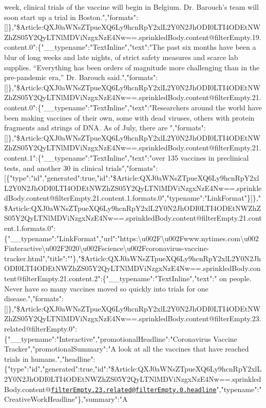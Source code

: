 week, clinical trials of the vaccine will begin in Belgium. Dr.
Barouch's team will soon start up a trial in
Boston.","formats":{[}{]}\},"\$Article:QXJ0aWNsZTpueXQ6Ly9hcnRpY2xlL2Y0N2JhODI0LTI4ODEtNWZhZS05Y2QyLTNlMDViNzgxNzE4Nw==.sprinkledBody.content@filterEmpty.19.content.0":\{"\_\_typename":"TextInline","text":"The
past six months have been a blur of long weeks and late nights, of
strict safety measures and scarce lab supplies. ``Everything has been
orders of magnitude more challenging than in the pre-pandemic era,'' Dr.
Barouch
said.","formats":{[}{]}\},"\$Article:QXJ0aWNsZTpueXQ6Ly9hcnRpY2xlL2Y0N2JhODI0LTI4ODEtNWZhZS05Y2QyLTNlMDViNzgxNzE4Nw==.sprinkledBody.content@filterEmpty.21.content.0":\{"\_\_typename":"TextInline","text":"Researchers
around the world have been making vaccines of their own, some with dead
viruses, others with protein fragments and strings of DNA. As of July,
there are
","formats":{[}{]}\},"\$Article:QXJ0aWNsZTpueXQ6Ly9hcnRpY2xlL2Y0N2JhODI0LTI4ODEtNWZhZS05Y2QyLTNlMDViNzgxNzE4Nw==.sprinkledBody.content@filterEmpty.21.content.1":\{"\_\_typename":"TextInline","text":"over
135 vaccines in preclinical tests, and another 30 in clinical
trials","formats":{[}\{"type":"id","generated":true,"id":"\$Article:QXJ0aWNsZTpueXQ6Ly9hcnRpY2xlL2Y0N2JhODI0LTI4ODEtNWZhZS05Y2QyLTNlMDViNzgxNzE4Nw==.sprinkledBody.content@filterEmpty.21.content.1.formats.0","typename":"LinkFormat"\}{]}\},"\$Article:QXJ0aWNsZTpueXQ6Ly9hcnRpY2xlL2Y0N2JhODI0LTI4ODEtNWZhZS05Y2QyLTNlMDViNzgxNzE4Nw==.sprinkledBody.content@filterEmpty.21.content.1.formats.0":\{"\_\_typename":"LinkFormat","url":"https:\textbackslash{}u002F\textbackslash{}u002Fwww.nytimes.com\textbackslash{}u002Finteractive\textbackslash{}u002F2020\textbackslash{}u002Fscience\textbackslash{}u002Fcoronavirus-vaccine-tracker.html","title":""\},"\$Article:QXJ0aWNsZTpueXQ6Ly9hcnRpY2xlL2Y0N2JhODI0LTI4ODEtNWZhZS05Y2QyLTNlMDViNzgxNzE4Nw==.sprinkledBody.content@filterEmpty.21.content.2":\{"\_\_typename":"TextInline","text":"
on people. Never have so many vaccines moved so quickly into trials for
one
disease.","formats":{[}{]}\},"\$Article:QXJ0aWNsZTpueXQ6Ly9hcnRpY2xlL2Y0N2JhODI0LTI4ODEtNWZhZS05Y2QyLTNlMDViNzgxNzE4Nw==.sprinkledBody.content@filterEmpty.23.related@filterEmpty.0":\{"\_\_typename":"Interactive","promotionalHeadline":"Coronavirus
Vaccine Tracker","promotionalSummary":"A look at all the vaccines that
have reached trials in
humans.","headline":\{"type":"id","generated":true,"id":"\$Article:QXJ0aWNsZTpueXQ6Ly9hcnRpY2xlL2Y0N2JhODI0LTI4ODEtNWZhZS05Y2QyLTNlMDViNzgxNzE4Nw==.sprinkledBody.content@\href{mailto:filterEmpty.23.related@filterEmpty.0.headline}{\nolinkurl{filterEmpty.23.related@filterEmpty.0.headline}}","typename":"CreativeWorkHeadline"\},"summary":"A
